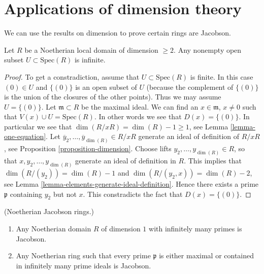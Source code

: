 \section{Applications of dimension theory}
\label{section-applications-dimension-theory}

\noindent
We can use the results on dimension to prove certain rings are
Jacobson.

\begin{lemma}
\label{lemma-Noetherian-local-domain-dim-2-infinite-opens}
Let $R$ be a Noetherian local domain of dimension $\geq 2$.
Any nonempty open subset $U \subset \text{Spec}(R)$ is
infinite.
\end{lemma}

\begin{proof}
To get a constradiction, assume that $U \subset \text{Spec}(R)$ is finite.
In this case $(0) \in U$ and $\{(0)\}$ is an open subset of $U$ (because
the complement of $\{(0)\}$ is the union of the closures of the other points).
Thus we may assume $U = \{(0)\}$.
Let $\mathfrak m \subset R$ be the maximal ideal.
We can find an $x \in \mathfrak m$, $x \not = 0$ such that
$V(x) \cup U = \text{Spec}(R)$. In other words we see that
$D(x) = \{(0)\}$. In particular we see
that $\dim(R/xR) = \dim(R) - 1 \geq 1$, see Lemma \ref{lemma-one-equation}.
Let $\overline{y}_2, \ldots, \overline{y}_{\dim(R)} \in R/xR$ generate
an ideal of definition of $R/xR$, see Proposition \ref{proposition-dimension}.
Choose lifts $y_2, \ldots, y_{\dim(R)} \in R$, so that
$x, y_2, \ldots, y_{\dim(R)}$ generate an ideal of definition in $R$.
This implies that $\dim(R/(y_2)) = \dim(R) - 1$ and
$\dim(R/(y_2, x)) = \dim(R) - 2$, see
Lemma \ref{lemma-elements-generate-ideal-definition}.
Hence there exists a prime
$\mathfrak p$ containing $y_2$ but not $x$. This constradicts
the fact that $D(x) = \{(0)\}$.
\end{proof}

\begin{lemma}
\label{lemma-noetherian-dim-1-Jacobson}
(Noetherian Jacobson rings.)
\begin{enumerate}
\item Any Noetherian domain $R$ of dimension $1$
with infinitely many primes is Jacobson.
\item Any Noetherian ring such that every prime
$\mathfrak p$ is either maximal or contained in
infinitely many prime ideals is Jacobson.
\end{enumerate}
\end{lemma}

